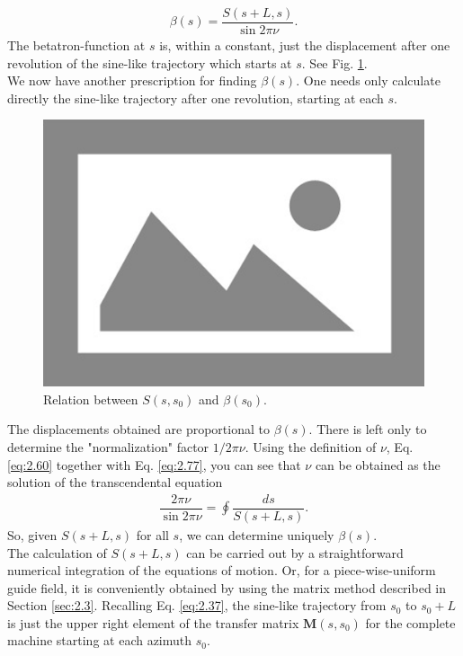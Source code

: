 \begin{align}\label{eq:2.77}
	\beta(s)=\dfrac{S(s+L,s)}{\sin2\pi\nu}.
\end{align}
The betatron-function at $s$ is, within a constant, just the displacement after one revolution
 of the sine-like trajectory which starts at $s$. See Fig. \ref{fig:fig19}.\\
We now have another prescription for finding $\beta(s)$. One needs only calculate directly the sine-like trajectory after one revolution, starting at each $s$.\\
\begin{figure}[!htb]
	\centering
	\includegraphics[width=0.8\linewidth]{./Figuras/placeholder.png}
	\caption{Relation between $S(s, s_0)$ and $\beta(s_0)$.}
	\label{fig:fig19}
\end{figure}
The displacements obtained are proportional to $\beta(s)$. There is left only to determine the "normalization" factor $1/2\pi\nu$. Using the definition of $\nu$, Eq. \eqref{eq:2.60} together with Eq. \eqref{eq:2.77}, you can see that $\nu$ can be obtained as the solution of the transcendental equation
\begin{align}
	\dfrac{2\pi\nu}{\sin{2\pi\nu}}=\oint\dfrac{ds}{S(s+L,s)}.
\end{align}
So, given $S(s+L, s)$ for all $s$, we can determine uniquely $\beta(s)$.\\
The calculation of $S(s +L, s)$ can be carried out by a straightforward numerical integration
 of the equations of motion. Or, for a piece-wise-uniform guide field, it is conveniently obtained by using the matrix method described in Section \ref{sec:2.3}. Recalling Eq. \eqref{eq:2.37}, the sine-like trajectory from $s_0$ to $s_0 + L$ is just the upper right element of the transfer matrix $\bm{M}(s, s_0)$ for the complete machine starting at each azimuth $s_0$.\\
